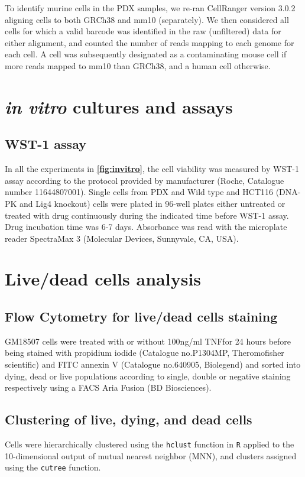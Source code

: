 To identify murine cells in the PDX samples, we re-ran CellRanger version 3.0.2 aligning cells to both GRCh38 and mm10 (separately). We then considered all cells for which a valid barcode was identified in the raw (unfiltered) data for either alignment, and counted the number of reads mapping to each genome for each cell. A cell was subsequently designated as a contaminating mouse cell if more reads mapped to mm10 than GRCh38, and a human cell otherwise.

\section{\textit{in vitro} cultures and assays}

\subsection{WST-1 assay}
In all the experiments in \textbf{\autoref{fig:invitro}}, the cell viability was measured by WST-1 assay according to the protocol provided by manufacturer (Roche, Catalogue number 11644807001). Single cells from PDX and Wild type and HCT116 (DNA-PK and Lig4 knockout) cells were plated in 96-well plates either untreated or treated with drug continuously during the indicated time before WST-1 assay. Drug incubation time was 6-7 days. Absorbance was read with the microplate reader SpectraMax 3 (Molecular Devices, Sunnyvale, CA, USA).


\section{Live/dead cells analysis}

\subsection{Flow Cytometry for live/dead cells staining}
 GM18507 cells were treated with or without 100ng/ml TNF\textalpha  for 24 hours before being stained with propidium iodide (Catalogue no.P1304MP, Theromofisher scientific) and FITC annexin V (Catalogue no.640905, Biolegend) and sorted into dying, dead or live populations according to single, double or negative staining respectively using a FACS Aria Fusion (BD Biosciences).
 
\subsection{Clustering of live, dying, and dead cells}
Cells were hierarchically clustered using the \texttt{hclust} function in \texttt{R} applied to the 10-dimensional output of mutual nearest neighbor (MNN), and clusters assigned using the \texttt{cutree} function.

